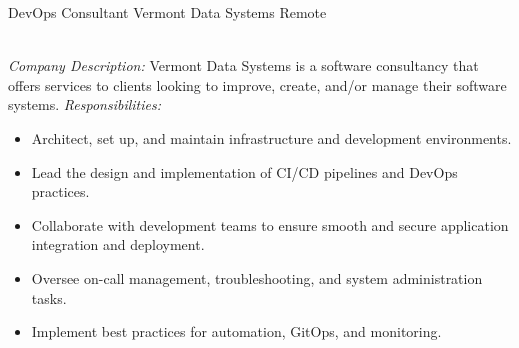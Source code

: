 \begin{samepage}
	{DevOps Consultant}
	{Vermont Data Systems}
	{Remote}{}
	{
		\emph{\\Company Description:}
		Vermont Data Systems is a software consultancy that offers services to
		clients looking to improve, create, and/or manage their software systems.
		\newline{}
		\newline{}
		\emph{Responsibilities:}
		\begin{itemize}
			\item Architect, set up, and maintain infrastructure and development environments.
    			\item Lead the design and implementation of CI/CD pipelines and DevOps practices.
    			\item Collaborate with development teams to ensure smooth and secure application integration and deployment.
    			\item Oversee on-call management, troubleshooting, and system administration tasks.
    			\item Implement best practices for automation, GitOps, and monitoring.\\
		\end{itemize}
	}
\end{samepage}

